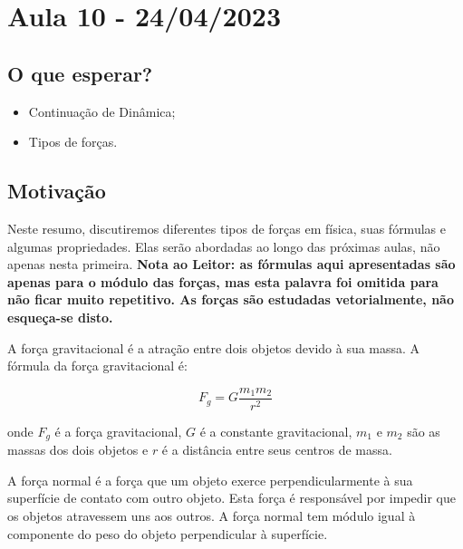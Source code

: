 \documentclass[physics_notes.tex]{subfiles}
\begin{document}
\section{Aula 10 - 24/04/2023}
\subsection{O que esperar?}
\begin{itemize}
	\item Continuação de Dinâmica;
	\item Tipos de forças.
\end{itemize}
\subsection{Motivação}
Neste resumo, discutiremos diferentes tipos de forças em física, suas fórmulas e algumas propriedades. Elas serão abordadas ao longo
das próximas aulas, não apenas nesta primeira. \textbf{Nota ao Leitor: as fórmulas aqui apresentadas são apenas
	para o módulo das forças, mas esta palavra foi omitida para não ficar muito repetitivo. As forças são estudadas vetorialmente,
	não esqueça-se disto.}

A força gravitacional é a atração entre dois objetos devido à sua massa. A fórmula da força gravitacional é:

\begin{equation}
	F_g = G \frac{m_1 m_2}{r^2}
\end{equation}

onde $F_g$ é a força gravitacional, $G$ é a constante gravitacional, $m_1$ e $m_2$ são as massas dos dois objetos e $r$ é a distância entre seus centros de massa.
\begin{center}
\end{center}

A força normal é a força que um objeto exerce perpendicularmente à sua superfície de contato com outro objeto. Esta força é responsável por impedir que os objetos atravessem uns aos outros. A força normal tem módulo igual à componente do peso do objeto perpendicular à superfície.

\begin{center}
\end{center}
\end{document}
